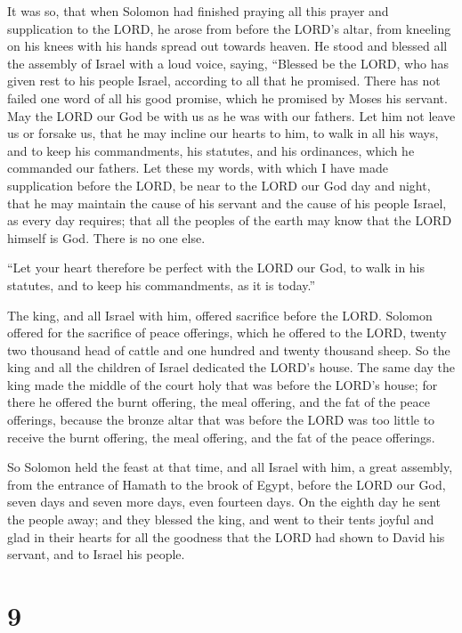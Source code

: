  It was so, that when Solomon had finished praying all this
prayer and supplication to the LORD, he arose from before the LORD's
altar, from kneeling on his knees with his hands spread out towards
heaven.  He stood and blessed all the assembly of Israel
with a loud voice, saying,  ``Blessed be the LORD, who has
given rest to his people Israel, according to all that he promised.
There has not failed one word of all his good promise, which he promised
by Moses his servant.  May the LORD our God be with us as
he was with our fathers. Let him not leave us or forsake us,
 that he may incline our hearts to him, to walk in all his
ways, and to keep his commandments, his statutes, and his ordinances,
which he commanded our fathers.  Let these my words, with
which I have made supplication before the LORD, be near to the LORD our
God day and night, that he may maintain the cause of his servant and the
cause of his people Israel, as every day requires;  that
all the peoples of the earth may know that the LORD himself is God.
There is no one else.

 ``Let your heart therefore be perfect with the LORD our
God, to walk in his statutes, and to keep his commandments, as it is
today.''

 The king, and all Israel with him, offered sacrifice
before the LORD.  Solomon offered for the sacrifice of
peace offerings, which he offered to the LORD, twenty two thousand head
of cattle and one hundred and twenty thousand sheep. So the king and all
the children of Israel dedicated the LORD's house.  The
same day the king made the middle of the court holy that was before the
LORD's house; for there he offered the burnt offering, the meal
offering, and the fat of the peace offerings, because the bronze altar
that was before the LORD was too little to receive the burnt offering,
the meal offering, and the fat of the peace offerings.

 So Solomon held the feast at that time, and all Israel
with him, a great assembly, from the entrance of Hamath to the brook of
Egypt, before the LORD our God, seven days and seven more days, even
fourteen days.  On the eighth day he sent the people away;
and they blessed the king, and went to their tents joyful and glad in
their hearts for all the goodness that the LORD had shown to David his
servant, and to Israel his people.

\hypertarget{section-8}{%
\section{9}\label{section-8}}

